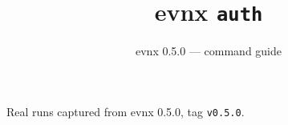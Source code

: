 \documentclass[aspectratio=169,10pt]{beamer}
\title{evnx \texttt{auth}}
\subtitle{evnx 0.5.0 — command guide}
\date{}
\begin{document}
\begin{frame}[plain]\titlepage
  \begin{center}\footnotesize
  \textcolor{evnxMuted}{Real runs captured from evnx 0.5.0, tag \texttt{v0.5.0}.}
  \end{center}
\end{frame}

\end{document}
